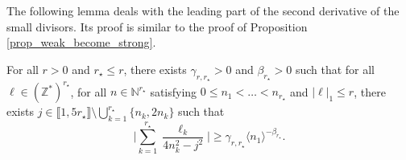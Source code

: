 The following lemma deals with the leading part of the second derivative of the small divisors. Its proof is similar to the proof of Proposition \ref{prop_weak_become_strong}.
\begin{lemma}\label{lem_SD_frac}
For all $r>0$ and $r_\star \leq r$, there exists $\gamma_{r,r_\star}>0$ and $\beta_{r_\star}>0$ such that for all $\ell \in (\mathbb{Z}^*)^{r_\star}$, for all $n \in \mathbb{N}^{r_\star}$ satisfying $0\leq n_1 < \dots < n_{r_\star}$ and $|\ell|_1 \leq r$, there exists $j\in \llbracket 1,5r_\star \rrbracket \setminus \bigcup_{k=1}^{r_\star}\{ n_k,2n_k\}$ such that
\begin{equation}
\label{eq_SD_rat}
\biggl| \sum_{k=1}^{r_\star} \frac{\ell_k}{4n_k^2-j^2} \biggr| \geq \gamma_{r,r_\star} \langle n_1 \rangle^{-\beta_{r_\star}}.
\end{equation}
\end{lemma}
